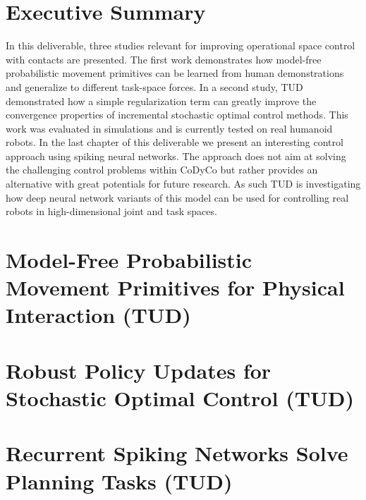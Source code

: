 \documentclass[12pt,a4paper,twoside]{report}
\begin{document}
\chapter{Executive Summary}

In this deliverable, three studies relevant for improving operational space 
control with contacts are presented. The first work demonstrates how model-free 
probabilistic movement primitives can be learned from human demonstrations and 
generalize to different task-space forces. In a second study, TUD demonstrated 
how a simple regularization term can greatly improve the convergence properties 
of incremental stochastic optimal control methods. This work was evaluated in 
simulations and is currently tested on real humanoid robots. In the last chapter 
of this deliverable we present an interesting control approach using spiking 
neural networks. The approach does not aim at solving the challenging control 
problems within CoDyCo but rather provides an alternative with great potentials 
for future research. As such TUD is investigating how deep neural network 
variants of this model can be used for controlling real robots in high-dimensional joint and task 
spaces.  



\chapter{Model-Free Probabilistic Movement Primitives for Physical Interaction (TUD)}\label{sec:AlexIROS}


\chapter{Robust Policy Updates for Stochastic Optimal Control (TUD)}\label{sec:ElmarHumanoids}


\chapter{Recurrent Spiking Networks Solve Planning Tasks (TUD)}\label{sec:ElmarScientificReports}

% 
%



\end{document}
